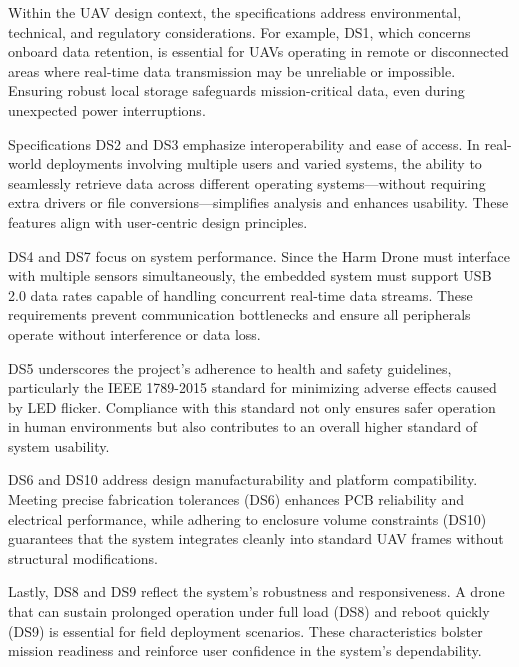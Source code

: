 \documentclass[12pt]{article}
\begin{document}
\par Within the UAV design context, the specifications address environmental, technical, and regulatory considerations. For example, DS1, which concerns onboard data retention, is essential for UAVs operating in remote or disconnected areas where real-time data transmission may be unreliable or impossible. Ensuring robust local storage safeguards mission-critical data, even during unexpected power interruptions.

\par Specifications DS2 and DS3 emphasize interoperability and ease of access. In real-world deployments involving multiple users and varied systems, the ability to seamlessly retrieve data across different operating systems—without requiring extra drivers or file conversions—simplifies analysis and enhances usability. These features align with user-centric design principles.

\par DS4 and DS7 focus on system performance. Since the Harm Drone must interface with multiple sensors simultaneously, the embedded system must support USB 2.0 data rates capable of handling concurrent real-time data streams. These requirements prevent communication bottlenecks and ensure all peripherals operate without interference or data loss.

\par DS5 underscores the project's adherence to health and safety guidelines, particularly the IEEE 1789-2015 standard for minimizing adverse effects caused by LED flicker. Compliance with this standard not only ensures safer operation in human environments but also contributes to an overall higher standard of system usability.

\par DS6 and DS10 address design manufacturability and platform compatibility. Meeting precise fabrication tolerances (DS6) enhances PCB reliability and electrical performance, while adhering to enclosure volume constraints (DS10) guarantees that the system integrates cleanly into standard UAV frames without structural modifications.

\par Lastly, DS8 and DS9 reflect the system’s robustness and responsiveness. A drone that can sustain prolonged operation under full load (DS8) and reboot quickly (DS9) is essential for field deployment scenarios. These characteristics bolster mission readiness and reinforce user confidence in the system’s dependability.
\end{document}
